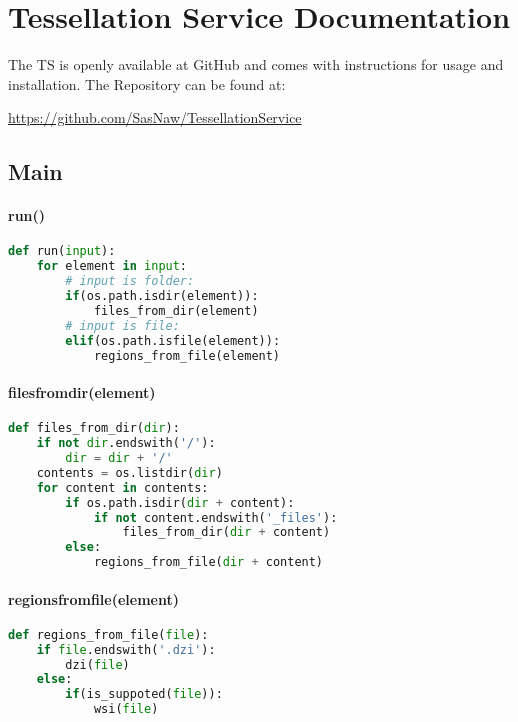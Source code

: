 \chapter{Tessellation Service Documentation}
\label{secC}
The TS is openly available at GitHub and comes with instructions for usage and installation. The Repository can be found at:

\url{https://github.com/SasNaw/TessellationService}

\section{Main}

\subsubsection{run()}

\begin{lstlisting}[frame=single,language=python]
def run(input):
	for element in input:
		# input is folder:
		if(os.path.isdir(element)):
			files_from_dir(element)
		# input is file:
		elif(os.path.isfile(element)):
			regions_from_file(element)
\end{lstlisting}


\subsubsection{files{\textunderscore}from{\textunderscore}dir(element)}

\begin{lstlisting}[frame=single,language=python]
def files_from_dir(dir):
	if not dir.endswith('/'):
		dir = dir + '/'
	contents = os.listdir(dir)
	for content in contents:
		if os.path.isdir(dir + content):
			if not content.endswith('_files'):
				files_from_dir(dir + content)
		else:
			regions_from_file(dir + content)
\end{lstlisting}


\subsubsection{regions{\textunderscore}from{\textunderscore}file(element)}

\begin{lstlisting}[frame=single,language=python]
def regions_from_file(file):
	if file.endswith('.dzi'):
		dzi(file)
	else:
		if(is_suppoted(file)):
			wsi(file)
\end{lstlisting}


